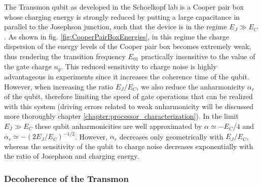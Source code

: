 The Transmon qubit as developed in the Schoelkopf lab \cite{koch_charge-insensitive_2007,wallraff_strong_2004} is a Cooper pair box whose charging energy is strongly reduced by putting a large capacitance in parallel to the Josephson junction, such that the device is in the regime $E_J\gg E_C$. As shown in fig. \ref{fig:CooperPairBoxEnergies}, in this regime the charge dispersion of the energy levels of the Cooper pair box becomes extremely weak, thus rendering the transition frequency $E_{01}$ practically insensitive to the value of the gate charge $n_g$. This reduced sensitivity to charge noise is highly advantageous in experiments since it increases the coherence time of the qubit. However, when increasing the ratio $E_J/E_C$, we also reduce the anharmonicity $\alpha_r$ of the qubit, therefore limiting the speed of gate operations that can be realized with this system (driving errors related to weak anharmonicity will be discussed more thoroughly chapter \ref{chapter:processor_characterization}). In the limit $E_J \gg E_C$ these qubit anharmonicities are well approximated by $\alpha \simeq -E_C/4$ and $\alpha_r \simeq -(2 E_J / E_C)^{-1/2}$. However, $\alpha_r$ decreases only geometrically with $E_J/E_C$, whereas the sensitivity of the qubit to charge noise decreases exponentially with the ratio of Josephson and charging energy.

\subsubsection{Decoherence of the Transmon}


